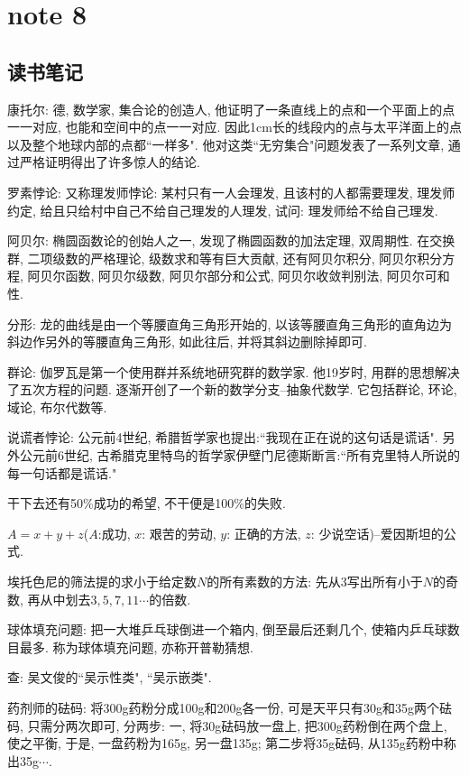 \chapter{note 8}
\section{读书笔记}
康托尔: 德, 数学家, 集合论的创造人, 他证明了一条直线上的点和一个平面上的点一一对应, 也能和空间中的点一一对应.
因此1cm长的线段内的点与太平洋面上的点以及整个地球内部的点都``一样多". 他对这类``无穷集合"问题发表了一系列文章,
通过严格证明得出了许多惊人的结论.

罗素悖论: 又称理发师悖论: 某村只有一人会理发, 且该村的人都需要理发, 理发师约定, 给且只给村中自己不给自己理发的人理发, 
试问: 理发师给不给自己理发.

阿贝尔: 椭圆函数论的创始人之一, 发现了椭圆函数的加法定理, 双周期性. 在交换群, 二项级数的严格理论, 级数求和等有巨大贡献,
还有阿贝尔积分, 阿贝尔积分方程, 阿贝尔函数, 阿贝尔级数, 阿贝尔部分和公式, 阿贝尔收敛判别法, 阿贝尔可和性.

分形: 龙的曲线是由一个等腰直角三角形开始的, 以该等腰直角三角形的直角边为斜边作另外的等腰直角三角形, 如此往后, 
并将其斜边删除掉即可.

群论: 伽罗瓦是第一个使用群并系统地研究群的数学家. 他19岁时, 用群的思想解决了五次方程的问题. 逐渐开创了一个新的数学分支--抽象代数学.
它包括群论, 环论, 域论, 布尔代数等.

说谎者悖论: 公元前4世纪, 希腊哲学家也提出:``我现在正在说的这句话是谎话". 另外公元前6世纪,
古希腊克里特鸟的哲学家伊壁门尼德斯断言:``所有克里特人所说的每一句话都是谎话."

干下去还有50\%成功的希望, 不干便是100\%的失败.

$A=x+y+z$($A$:成功, $x$: 艰苦的劳动, $y$: 正确的方法, $z$: 少说空话)--爱因斯坦的公式.

埃托色尼的筛法提的求小于给定数$N$的所有素数的方法: 先从3写出所有小于$N$的奇数, 
再从中划去$3, 5, 7, 11\cdots$的倍数.

球体填充问题: 把一大堆乒乓球倒进一个箱内, 倒至最后还剩几个, 使箱内乒乓球数目最多. 称为球体填充问题, 亦称开普勒猜想.

查: 吴文俊的``吴示性类", ``吴示嵌类".

药剂师的砝码: 将300g药粉分成100g和200g各一份, 可是天平只有30g和35g两个砝码, 只需分两次即可, 分两步:
一, 将30g砝码放一盘上, 把300g药粉倒在两个盘上, 使之平衡, 于是, 一盘药粉为165g, 另一盘135g; 第二步将35g砝码, 
从135g药粉中称出35g$\cdots$.

